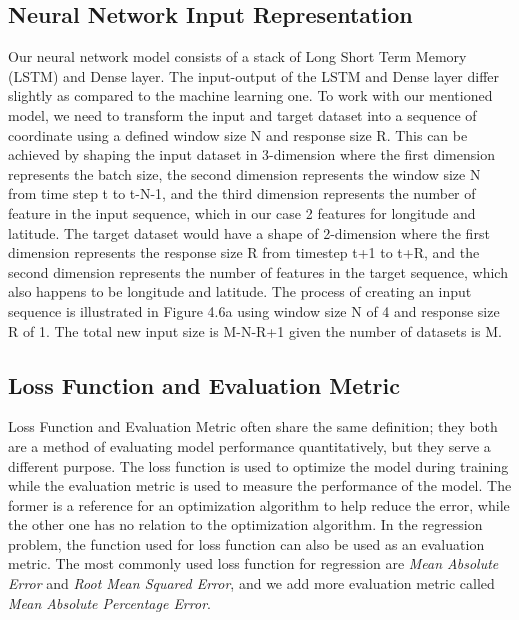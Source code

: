 \subsection{Neural Network Input Representation}
Our neural network model consists of a stack of Long Short Term Memory (LSTM) and Dense layer. The input-output of the LSTM and Dense layer differ slightly as compared to the machine learning one. To work with our mentioned model, we need to transform the input and target dataset into a sequence of coordinate using a defined window size N and response size R. This can be achieved by shaping the input dataset in 3-dimension where the first dimension represents the batch size, the second dimension represents the window size N from time step t to t-N-1, and the third dimension represents the number of feature in the input sequence, which in our case 2 features for longitude and latitude. The target dataset would have a shape of 2-dimension where the first dimension represents the response size R from timestep t+1 to t+R, and the second dimension represents the number of features in the target sequence, which also happens to be longitude and latitude. The process of creating an input sequence is illustrated in Figure 4.6a using window size N of 4 and response size R of 1. The total new input size is M-N-R+1 given the number of datasets is M.

\subsection{Loss Function and Evaluation Metric}
Loss Function and Evaluation Metric often share the same definition; they both are a method of evaluating model performance quantitatively, but they serve a different purpose. The loss function is used to optimize the model during training while the evaluation metric is used to measure the performance of the model. The former is a reference for an optimization algorithm to help reduce the error, while the other one has no relation to the optimization algorithm. In the regression problem, the function used for loss function can also be used as an evaluation metric. The most commonly used loss function for regression are \emph{Mean Absolute Error} and \emph{Root Mean Squared Error}, and we add more evaluation metric called \emph{Mean Absolute Percentage Error}.

